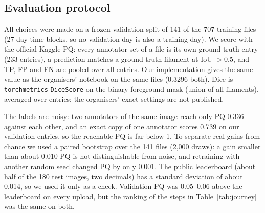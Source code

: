 
\subsection{Evaluation protocol}
All choices were made on a frozen validation split of 141 of the 707 training files (27-day time blocks, so no
validation day is also a training day). We score with the official Kaggle PQ: every annotator set of a file is its
own ground-truth entry (233 entries), a prediction matches a ground-truth filament at IoU $>0.5$, and TP, FP and FN
are pooled over all entries.
Our implementation gives the same value as the organisers' notebook on the same files (0.3296 both).
Dice is \texttt{torchmetrics} \texttt{DiceScore} on the binary foreground mask (union of all filaments), averaged
over entries; the organisers' exact settings are not published.

The labels are noisy: two annotators of the same image reach only PQ 0.336 against each other, and an exact copy of
one annotator scores 0.739 on our validation entries, so the reachable PQ is far below 1.
To separate real gains from chance we used a paired bootstrap over the 141 files (2,000 draws): a gain smaller than
about 0.010 PQ is not distinguishable from noise, and retraining with another random seed changed PQ by only 0.001.
The public leaderboard (about half of the 180 test images, two decimals) has a standard deviation of about 0.014,
so we used it only as a check. Validation PQ was 0.05--0.06 above the leaderboard on every upload, but the ranking
of the steps in Table~\ref{tab:journey} was the same on both.

